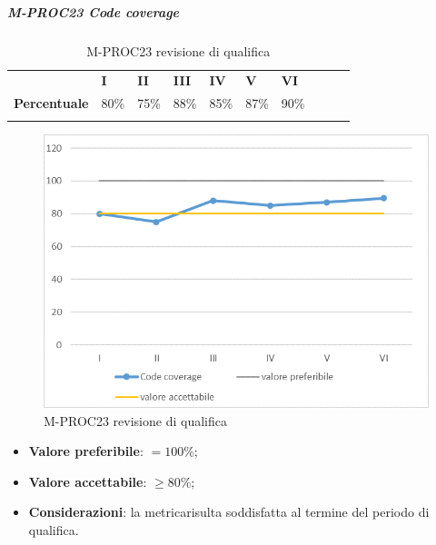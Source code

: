 \subparagraph{M-PROC23 Code coverage} \mbox{}
\begin{longtable}[H!] {						
		>{}p{35mm}  		
		>{}p{12mm}
		>{}p{12mm}		
		>{}p{12mm}		
		>{}p{12mm}		
		>{}p{12mm}		
		>{}p{12mm}
		>{}p{12mm}
		>{}p{12mm}
		>{}p{12mm}
	}
	\rowcolor{gray!50}
	\textbf{} & \textbf{I} & \textbf{II} & \textbf{III} & \textbf{IV} & \textbf{V} & \textbf{VI} \TBstrut \\ [2mm]
	\textbf{Percentuale} & 80\% & 75\% & 88\% & 85\% & 87\% & 90\% \TBstrut \\ [2mm]
	\rowcolor{white}
	\caption{M-PROC23 revisione di qualifica}
\end{longtable}
\begin{figure}[H] 	
	\includegraphics[width=\linewidth]{./img/grafici/RQ23.png}	
	\caption{M-PROC23 revisione di qualifica}	
\end{figure}
\begin{itemize}
	\item \textbf{Valore preferibile}: $=100\%$;
	\item \textbf{Valore accettabile}: $\ge 80\%$;
	\item \textbf{Considerazioni}: la metrica\glosp risulta soddisfatta al termine del periodo di qualifica.
\end{itemize}

